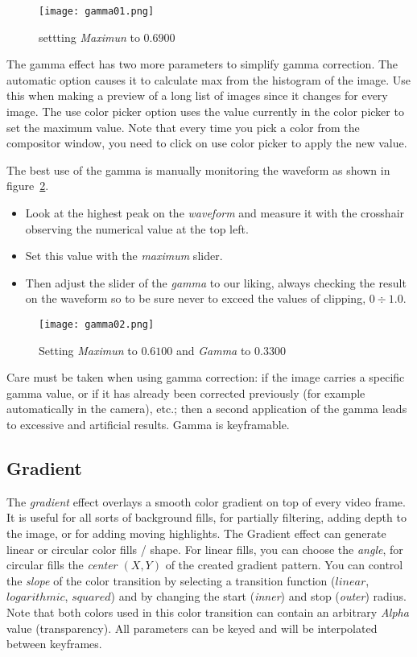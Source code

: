 \begin{figure}[htpb]
    \centering
    \texttt{[image: gamma01.png]}
    \caption{settting \textit{Maximun} to $0.6900$}
    \label{fig:gamma01}
\end{figure}

The gamma effect has two more parameters to simplify gamma correction. The automatic option causes it to calculate max from the histogram of the image. Use this when making a preview of a long list of images since it changes for every image. The use color picker option uses the value currently in the color picker to set the maximum value. Note that every time you pick a color from the compositor window, you need to click on use color picker to apply the new value.

The best use of the gamma is manually monitoring the waveform as shown in figure~\ref{fig:gamma02}.

\begin{itemize}
    \item Look at the highest peak on the \textit{waveform} and measure it with the crosshair observing the numerical value at the top left.
    \item Set this value with the \textit{maximum} slider.
    \item Then adjust the slider of the \textit{gamma} to our liking, always checking the result on the waveform so to be sure never to exceed the values of clipping, $0 \div 1.0$.
\end{itemize}

\begin{figure}[htpb]
    \centering
    \texttt{[image: gamma02.png]}
    \caption{Setting \textit{Maximun} to $0.6100$ and \textit{Gamma} to $0.3300$}
    \label{fig:gamma02}
\end{figure}

Care must be taken when using gamma correction: if the image carries a specific gamma value, or if it has already been corrected previously (for example automatically in the camera), etc.; then a second application of the gamma leads to excessive and artificial results. Gamma is keyframable.

\subsection{Gradient}%
\label{sub:gradient}

The \textit{gradient} effect overlays a smooth color gradient on top of every video frame. It is useful for all sorts of background fills, for partially filtering, adding depth to the image, or for adding moving highlights. The Gradient effect can generate linear or circular color fills / shape. For linear fills, you can choose the \textit{angle}, for circular fills the \textit{center $(X,Y)$} of the created gradient pattern. You can control the \textit{slope} of the color transition by selecting a transition function ($linear$, $logarithmic$, $squared$) and by changing the start (\textit{inner}) and stop (\textit{outer}) radius. Note that both colors used in this color transition can contain an arbitrary \textit{Alpha} value (transparency). All parameters can be keyed and will be interpolated between keyframes.

